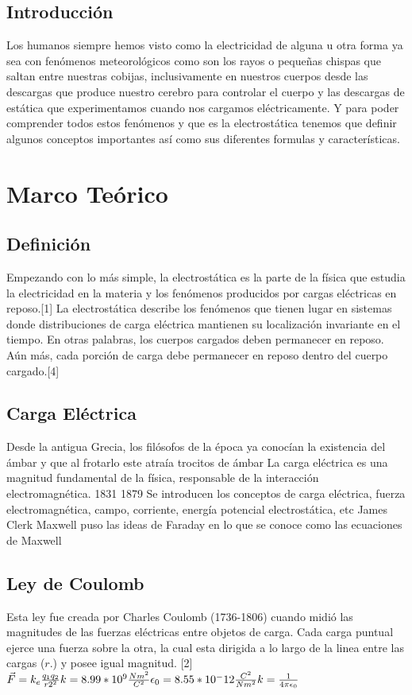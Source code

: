 \documentclass[14pt]{article}
\begin{document}
	\subsection{Introducción}
	Los humanos siempre hemos visto como la electricidad de alguna u otra forma ya sea con fenómenos meteorológicos como son los rayos o pequeñas chispas que saltan entre nuestras cobijas, inclusivamente en nuestros cuerpos desde las descargas que produce nuestro cerebro para controlar el cuerpo y las descargas de estática que experimentamos cuando nos cargamos eléctricamente. Y para poder comprender todos estos fenómenos y que es la electrostática tenemos que definir algunos conceptos importantes así como sus diferentes formulas y características. 
	\section {Marco Teórico}
	  	
	\subsection{Definición}
	Empezando con lo más simple, la electrostática es la parte de la física que estudia la electricidad en la materia y los
	fenómenos producidos por cargas eléctricas en reposo.[1]
	La electrostática describe los fenómenos que tienen lugar en sistemas donde distribuciones de carga eléctrica mantienen su localización invariante en el tiempo. En
	otras palabras, los cuerpos cargados deben permanecer en reposo. Aún más, cada porción de carga debe permanecer en reposo dentro del cuerpo cargado.[4]
	\subsection{Carga Eléctrica}
	Desde la antigua Grecia, los filósofos de la época ya conocían la existencia del ámbar y que al frotarlo este atraía trocitos de ámbar
	La carga eléctrica es una magnitud fundamental de la física, responsable de la interacción electromagnética.
	1831
	1879 Se introducen los conceptos de carga eléctrica, fuerza
	electromagnética, campo, corriente, energía potencial electrostática, etc
	James Clerk Maxwell puso las ideas de Faraday en lo que se conoce como
	las ecuaciones de Maxwell
	
	\subsection{Ley de Coulomb}
	Esta ley fue creada por Charles Coulomb (1736-1806) cuando midió las magnitudes de las fuerzas eléctricas entre objetos de carga. Cada carga puntual ejerce una fuerza sobre la otra, la cual esta dirigida a lo largo de la linea entre las cargas ($r.$) y posee igual magnitud. [2]\\
	\begin{math}
		 \vec{F} = k_{e} \frac{q_{1}q_{2}}{r{2^2}} \\  
		 k = 8.99*10^9 \frac{Nm^2}{C^2} \\
		 \epsilon_{0} = 8.55*10^-12 \frac{C^2}{Nm^2} \\
		 k = \frac{1}{4 \pi \epsilon_{0}} \\
	\end{math}
	
\end{document}
